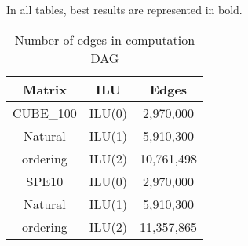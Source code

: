 In all tables, best results are represented in bold.


\begin{table}[!h]
  \renewcommand{\arraystretch}{1.3}
  \caption{Number of edges in computation DAG}
  \label{tab:edges}
  \centering
  \begin{tabular}{|c|c||c|}
    \hline
     Matrix & ILU & Edges\\
     \hline
     \hline
     CUBE\_100 & ILU(0) & 2,970,000\\
     Natural   & ILU(1) & 5,910,300\\
     ordering  & ILU(2) & 10,761,498\\
     \hline
     SPE10     & ILU(0) & 2,970,000\\
     Natural   & ILU(1) & 5,910,300\\
     ordering  & ILU(2) & 11,357,865\\
     \hline
   \end{tabular}
\end{table}






